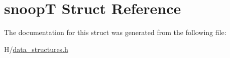 \hypertarget{structsnoopT}{
\section{snoopT Struct Reference}
\label{structsnoopT}
}


The documentation for this struct was generated from the following file:\begin{DoxyCompactItemize}
\item 
H/\hyperlink{data__structures_8h}{data\_\-structures.h}\end{DoxyCompactItemize}
